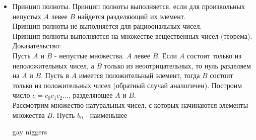 \documentclass[12pt,a4paper]{article}
\begin{document}
\begin{itemize}
\item Принцип полноты. 
Принцип полноты выполняется, если для произвольных непустых $A$ левее $B$ найдется разделяющий их элемент. \\
Принцип полноты не выполняется для рациоональных чисел. \\
Принцип полноты выполняется на множестве вещественных чисел (теорема).\\
Доказательство: \\
Пусть $A$ и $B$ - непустые множества.  $A$ левее $B$. Если $A$ состоит только из неположительных чисел, а $B$ только из неоотрицательных, то нуль разделяем на $A$ и $B$. Пусть в $A$ имеется положительный элемент, тогда $B$ состоит только из положительных чисел (обратный случай аналогичен). Построим число $c = c_0c_1c_2...$, разделяющее $A$ и $B$. \\
Рассмотрим множество натуральных чисел, с которых начинаются элементы множества $B$. Пусть $b_0$ - наименьшее

gay niggers
\end{itemize}
\end{document}
